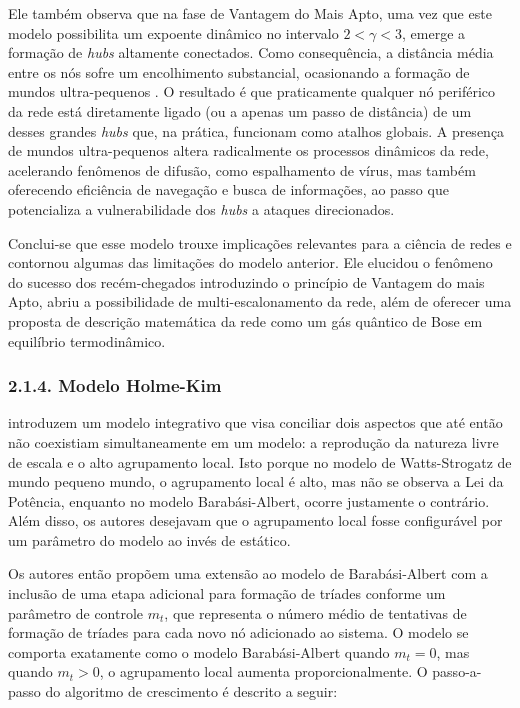 \documentclass[12pt,oneside,a4paper,brazil,sumario=tradicional]{abntex2}
\begin{document}
Ele também observa que na fase de Vantagem do Mais Apto, uma vez que este modelo possibilita um expoente dinâmico no intervalo $2 < \gamma < 3$, emerge a formação de \textit{hubs }altamente conectados. Como consequência, a distância média entre os nós sofre um encolhimento substancial, ocasionando a formação de mundos ultra-pequenos \cite{cohen2003}. O resultado é que praticamente qualquer nó periférico da rede está diretamente ligado (ou a apenas um passo de distância) de um desses grandes \textit{hubs} que, na prática, funcionam como atalhos globais. A presença de mundos ultra-pequenos altera radicalmente os processos dinâmicos da rede, acelerando fenômenos de difusão, como espalhamento de vírus, mas também oferecendo eficiência de navegação e busca de informações, ao passo que potencializa a vulnerabilidade dos \textit{hubs }a ataques direcionados.

Conclui-se que esse modelo trouxe implicações relevantes para a ciência de redes e contornou algumas das limitações do modelo anterior. Ele elucidou o fenômeno do sucesso dos recém-chegados introduzindo o princípio de Vantagem do mais Apto, abriu a possibilidade de multi-escalonamento da rede, além de oferecer uma proposta de descrição matemática da rede como um gás quântico de Bose em equilíbrio termodinâmico.

\subsubsection*{2.1.4. Modelo Holme-Kim}
 introduzem um modelo integrativo que visa conciliar dois aspectos que até então não coexistiam simultaneamente em um modelo:\textit{ }a reprodução da natureza livre de escala e o alto agrupamento local. Isto porque no modelo de Watts-Strogatz de mundo pequeno mundo, o agrupamento local é alto, mas não se observa a Lei da Potência, enquanto no modelo Barabási-Albert, ocorre justamente o contrário. Além disso, os autores desejavam que o agrupamento local fosse configurável por um parâmetro do modelo ao invés de estático.

Os autores então propõem uma extensão ao modelo de Barabási-Albert com a inclusão de uma etapa adicional para formação de tríades conforme um parâmetro de controle $m_{t}$, que representa o número médio de tentativas de formação de tríades para cada novo nó adicionado ao sistema. O modelo se comporta exatamente como o modelo Barabási-Albert quando $m_{t} = 0$, mas quando $m_{t} > 0$, o agrupamento local aumenta proporcionalmente. O passo-a-passo do algoritmo de crescimento é descrito a seguir:
\end{document}
